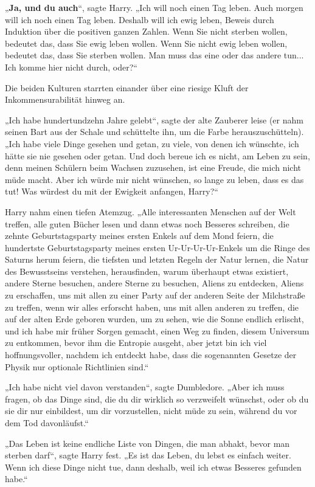 {„\textbf{Ja, und du auch}“, sagte Harry. „Ich will noch einen Tag leben. Auch morgen will ich noch einen Tag leben. Deshalb will ich ewig leben, Beweis durch Induktion über die positiven ganzen Zahlen. Wenn Sie nicht sterben wollen, bedeutet das, dass Sie ewig leben wollen. Wenn Sie nicht ewig leben wollen, bedeutet das, dass Sie sterben wollen. Man muss das eine oder das andere tun... Ich komme hier nicht durch, oder?“

Die beiden Kulturen starrten einander über eine riesige Kluft der Inkommensurabilität hinweg an.

„Ich habe hundertundzehn Jahre gelebt“, sagte der alte Zauberer leise (er nahm seinen Bart aus der Schale und schüttelte ihn, um die Farbe herauszuschütteln). „Ich habe viele Dinge gesehen und getan, zu viele, von denen ich wünschte, ich hätte sie nie gesehen oder getan. Und doch bereue ich es nicht, am Leben zu sein, denn meinen Schülern beim Wachsen zuzusehen, ist eine Freude, die mich nicht müde macht. Aber ich würde mir nicht wünschen, so lange zu leben, dass es das tut! Was würdest du mit der Ewigkeit anfangen, Harry?“

Harry nahm einen tiefen Atemzug. „Alle interessanten Menschen auf der Welt treffen, alle guten Bücher lesen und dann etwas noch Besseres schreiben, die zehnte Geburtstagsparty meines ersten Enkels auf dem Mond feiern, die hundertste Geburtstagsparty meines ersten Ur-Ur-Ur-Ur-Enkels um die Ringe des Saturns herum feiern, die tiefsten und letzten Regeln der Natur lernen, die Natur des Bewusstseins verstehen, herausfinden, warum überhaupt etwas existiert, andere Sterne besuchen, andere Sterne zu besuchen, Aliens zu entdecken, Aliens zu erschaffen, uns mit allen zu einer Party auf der anderen Seite der Milchstraße zu treffen, wenn wir alles erforscht haben, uns mit allen anderen zu treffen, die auf der alten Erde geboren wurden, um zu sehen, wie die Sonne endlich erlischt, und ich habe mir früher Sorgen gemacht, einen Weg zu finden, diesem Universum zu entkommen, bevor ihm die Entropie ausgeht, aber jetzt bin ich viel hoffnungsvoller, nachdem ich entdeckt habe, dass die sogenannten Gesetze der Physik nur optionale Richtlinien sind.“

„Ich habe nicht viel davon verstanden“, sagte Dumbledore. „Aber ich muss fragen, ob das Dinge sind, die du dir wirklich so verzweifelt wünschst, oder ob du sie dir nur einbildest, um dir vorzustellen, nicht müde zu sein, während du vor dem Tod davonläufst.“

„Das Leben ist keine endliche Liste von Dingen, die man abhakt, bevor man sterben darf“, sagte Harry fest. „Es ist das Leben, du lebst es einfach weiter. Wenn ich diese Dinge nicht tue, dann deshalb, weil ich etwas Besseres gefunden habe.“

}
